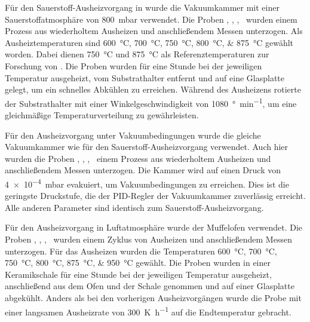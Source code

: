 Für den Sauerstoff-Aus\-heiz\-vor\-gang in wurde die Vakuumkammer mit einer Sauerstoffatmosphäre
von \qty{800}{\milli\bar} verwendet.
Die Proben \samplethree, \sampleone, \sampletwo, \samplefour\ wurden einem Prozess aus wiederholtem Ausheizen und
anschließendem Messen unterzogen.
Als Ausheiztemperaturen sind \qtylist{600;700;750;800;875}{\degreeCelsius} gewählt worden.
Dabei dienen \qty{750}{\degreeCelsius} und \qty{875}{\degreeCelsius} als Referenztemperaturen zur Forschung
von  \autocite{Rost2015}.
Die Proben wurden für eine Stunde bei der jeweiligen Temperatur ausgeheizt, vom Substrathalter entfernt und auf eine
Glasplatte gelegt, um ein schnelles Abkühlen zu erreichen.
Während des Ausheizens rotierte der Substrathalter mit einer Winkelgeschwindigkeit von
\qty{1080}{\degree\per\minute}, um eine
gleichmäßige Temperaturverteilung zu gewährleisten.

Für den Aus\-heiz\-vor\-gang unter Vakuumbedingungen wurde die gleiche Vakuumkammer wie für den Sauerstoff-Aus\-heiz\-vor\-gang
verwendet.
Auch hier wurden die Proben \samplethree, \sampleone, \sampletwo, \samplefour\ einem Prozess aus wiederholtem
Ausheizen und anschließendem Messen unterzogen.
Die Kammer wird auf einen Druck von \qty{4e-4}{\milli\bar} evakuiert, um Vakuumbedingungen zu erreichen.
Dies ist die geringste Druckstufe, die der PID-Regler der Vakuumkammer zuverlässig erreicht.
Alle anderen Parameter sind identisch zum Sauerstoff-Aus\-heiz\-vor\-gang.

Für den Aus\-heiz\-vor\-gang in Luftatmosphäre wurde der Muffelofen verwendet.
Die Proben \samplethree, \sampleone, \sampletwo, \samplefour\ wurden einem Zyklus von Ausheizen und anschließendem
Messen unterzogen.
Für das Ausheizen wurden die Temperaturen \qtylist{600;700;750;800;875;950}{\degreeCelsius} gewählt.
Die Proben wurden in einer Keramikschale für eine Stunde bei der jeweiligen Temperatur ausgeheizt, anschließend
aus dem Ofen und der Schale genommen und auf einer Glasplatte abgekühlt.
Anders als bei den vorherigen Ausheizvorgängen wurde die Probe mit einer langsamen Ausheizrate von
\qty{300}{\kelvin\per\hour} auf die Endtemperatur gebracht.

